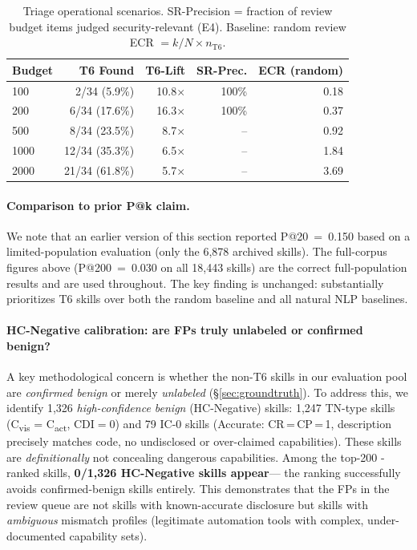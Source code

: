 \begin{table}[h]
\centering
\caption{Triage operational scenarios.
  SR-Precision = fraction of review budget items judged security-relevant (E4).
  Baseline: random review ECR $={k}/{N}\times n_{\text{T6}}$.}
\label{tab:triage_ops}
\small
\begin{tabular}{@{}lrrrr@{}}
\toprule
\textbf{Budget} & \textbf{T6 Found} & \textbf{T6-Lift} & \textbf{SR-Prec.} & \textbf{ECR (random)} \\
\midrule
100  & 2/34 (5.9\%)  & 10.8$\times$ & 100\% & 0.18 \\
200  & 6/34 (17.6\%) & 16.3$\times$ & 100\% & 0.37 \\
500  & 8/34 (23.5\%) & 8.7$\times$  & --    & 0.92 \\
1000 & 12/34 (35.3\%) & 6.5$\times$ & --    & 1.84 \\
2000 & 21/34 (61.8\%) & 5.7$\times$ & --    & 3.69 \\
\bottomrule
\end{tabular}
\end{table}

\paragraph{Comparison to prior P@k claim.}
We note that an earlier version of this section reported P@20~=~0.150
based on a limited-population evaluation (only the 6,878 archived skills).
The full-corpus figures above (P@200~=~0.030 on all 18,443 skills)
are the correct full-population results and are used throughout.
The key finding is unchanged: \sysname substantially prioritizes T6 skills
over both the random baseline and all natural NLP baselines.

\paragraph{HC-Negative calibration: are FPs truly unlabeled or confirmed benign?}
A key methodological concern is whether the non-T6 skills in our evaluation
pool are \emph{confirmed benign} or merely \emph{unlabeled} (\S\ref{sec:groundtruth}).
To address this, we identify 1,326 \emph{high-confidence benign} (HC-Negative) skills:
1,247 TN-type skills (C\textsubscript{vis} = C\textsubscript{act}, CDI$=$0)
and 79 IC-0 skills (Accurate: CR\,=\,CP\,=\,1, description precisely
matches code, no undisclosed or over-claimed capabilities).
These skills are \emph{definitionally} not concealing dangerous capabilities.
Among the top-200 \sysname-ranked skills, \textbf{0/1,326 HC-Negative skills appear}---
the ranking successfully avoids confirmed-benign skills entirely.
This demonstrates that the FPs in the review queue are not skills
with known-accurate disclosure but skills with \emph{ambiguous} mismatch profiles
(legitimate automation tools with complex, under-documented capability sets).

